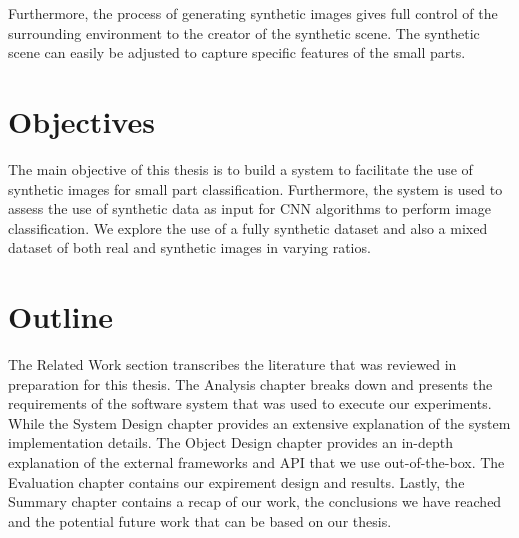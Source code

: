 Furthermore, the process of generating synthetic images gives full control of the surrounding environment to the creator of the synthetic scene. The synthetic scene can easily be adjusted to capture specific features of the small parts.

\section{Objectives}

The main objective of this thesis is to build a system to facilitate the use of synthetic images for small part classification. Furthermore, the system is used to assess the use of synthetic data as input for CNN algorithms to perform image classification. We explore the use of a fully synthetic dataset and also a mixed dataset of both real and synthetic images in varying ratios.

\section{Outline}

The Related Work section transcribes the literature that was reviewed in preparation for this thesis. The Analysis chapter breaks down and presents the requirements of the software system that was used to execute our experiments. While the System Design chapter provides an extensive explanation of the system implementation details. The Object Design chapter provides an in-depth explanation of the external frameworks and API that we use out-of-the-box. The Evaluation chapter contains our expirement design and results. Lastly, the Summary chapter contains a recap of our work, the conclusions we have reached and the potential future work that can be based on our thesis.